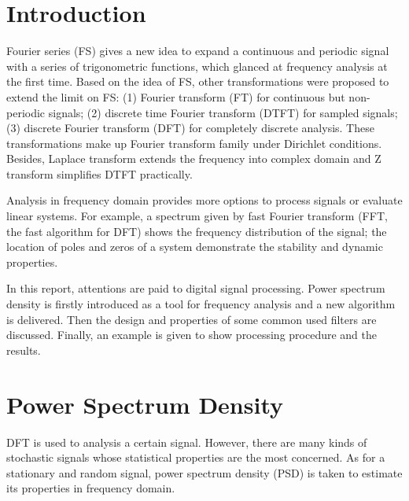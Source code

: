 \section{Introduction}


Fourier series (FS) gives a new idea to expand a continuous and periodic signal with a series of trigonometric functions, which glanced at frequency analysis at the first time. Based on the idea of FS, other transformations were proposed to extend the limit on FS: (1) Fourier transform (FT) for continuous but non-periodic signals; (2) discrete time Fourier transform (DTFT) for sampled signals; (3) discrete Fourier transform (DFT) for completely discrete analysis. These transformations make up Fourier transform family under Dirichlet conditions. Besides, Laplace transform extends the frequency into complex domain and Z transform simplifies DTFT practically.


Analysis in frequency domain provides more options to process signals or evaluate linear systems. For example, a spectrum given by fast Fourier transform (FFT, the fast algorithm for DFT) shows the frequency distribution of the signal; the location of poles and zeros of a system demonstrate the stability and dynamic properties.


In this report, attentions are paid to digital signal processing. Power spectrum density is firstly introduced as a tool for frequency analysis and a new algorithm is delivered. Then the design and properties of some common used filters are discussed. Finally, an example is given to show processing procedure and the results.




\section{Power Spectrum Density}


DFT is used to analysis a certain signal. However, there are many kinds of stochastic signals whose statistical properties are the most concerned. As for a stationary and random signal, power spectrum density (PSD) is taken to estimate its properties in frequency domain.


